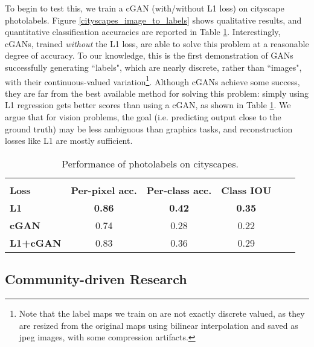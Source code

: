 \documentclass[10pt,twocolumn,letterpaper]{article}
\begin{document}
To begin to test this, we train a cGAN (with/without L1 loss) on cityscape photolabels. Figure \ref{cityscapes_image_to_labels} shows qualitative results, and quantitative classification accuracies are reported in Table \ref{tab:image_to_labels_results}. Interestingly, cGANs, trained \emph{without} the L1 loss, are able to solve this problem at a reasonable degree of accuracy. To our knowledge, this is the first demonstration of GANs successfully generating ``labels", which are nearly discrete, rather than ``images", with their continuous-valued variation\footnote{Note that the label maps we train on are not exactly discrete valued, as they are resized from the original maps using bilinear interpolation and saved as jpeg images, with some compression artifacts.}.
Although cGANs achieve some success, they are far from the best available method for solving this problem: simply using L1 regression gets better scores than using a cGAN, as shown in Table \ref{tab:image_to_labels_results}. We argue that for vision problems, the goal (i.e. predicting output close to the ground truth) may be less ambiguous than graphics tasks, and reconstruction losses like L1 are mostly sufficient.



\begin{table}
\centering
\scalebox{0.75} {
\begin{tabular}{lccccc}
 & & & \\
\textbf{Loss} & \textbf{Per-pixel acc.} & \textbf{Per-class acc.} & \textbf{Class IOU} \\ \hline
\textbf{L1} & \textbf{0.86} & \textbf{0.42} & \textbf{0.35} \\
\textbf{cGAN} & 0.74 & 0.28 & 0.22 \\
\textbf{L1+cGAN} & 0.83 & 0.36 & 0.29 \\ \end{tabular} }
\vspace{-0.1in}
\caption {Performance of photolabels on cityscapes.}
\vspace{-0.2in}
\label{tab:image_to_labels_results}
\end{table}



\subsection{Community-driven Research}
\end{document}
